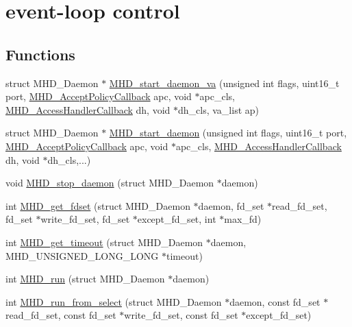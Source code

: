 \hypertarget{group__event}{\section{event-\/loop control}
\label{group__event}
}
\subsection*{\-Functions}
\begin{DoxyCompactItemize}
\item 
struct \-M\-H\-D\-\_\-\-Daemon $\ast$ \hyperlink{group__event_gae52e025a2bed7eacd487fe31dadb6c57}{\-M\-H\-D\-\_\-start\-\_\-daemon\-\_\-va} (unsigned int flags, uint16\-\_\-t port, \hyperlink{microhttpd_8h_aeb5663e00846f6a4df836e730381a9f2}{\-M\-H\-D\-\_\-\-Accept\-Policy\-Callback} apc, void $\ast$apc\-\_\-cls, \hyperlink{microhttpd_8h_a7d207efa3873993c6d3a72beb9367f75}{\-M\-H\-D\-\_\-\-Access\-Handler\-Callback} dh, void $\ast$dh\-\_\-cls, va\-\_\-list ap)
\item 
struct \-M\-H\-D\-\_\-\-Daemon $\ast$ \hyperlink{group__event_ga2630f8fc0c01fefe0abe1d2476b0388d}{\-M\-H\-D\-\_\-start\-\_\-daemon} (unsigned int flags, uint16\-\_\-t port, \hyperlink{microhttpd_8h_aeb5663e00846f6a4df836e730381a9f2}{\-M\-H\-D\-\_\-\-Accept\-Policy\-Callback} apc, void $\ast$apc\-\_\-cls, \hyperlink{microhttpd_8h_a7d207efa3873993c6d3a72beb9367f75}{\-M\-H\-D\-\_\-\-Access\-Handler\-Callback} dh, void $\ast$dh\-\_\-cls,...)
\item 
void \hyperlink{group__event_ga30c557319e35be05fceb99ce568e1242}{\-M\-H\-D\-\_\-stop\-\_\-daemon} (struct \-M\-H\-D\-\_\-\-Daemon $\ast$daemon)
\item 
int \hyperlink{group__event_gad3adac36bc7520280fe2b82fcc254801}{\-M\-H\-D\-\_\-get\-\_\-fdset} (struct \-M\-H\-D\-\_\-\-Daemon $\ast$daemon, fd\-\_\-set $\ast$read\-\_\-fd\-\_\-set, fd\-\_\-set $\ast$write\-\_\-fd\-\_\-set, fd\-\_\-set $\ast$except\-\_\-fd\-\_\-set, int $\ast$max\-\_\-fd)
\item 
int \hyperlink{group__event_gacda7636c2538a14f817befe91d7a2f21}{\-M\-H\-D\-\_\-get\-\_\-timeout} (struct \-M\-H\-D\-\_\-\-Daemon $\ast$daemon, \-M\-H\-D\-\_\-\-U\-N\-S\-I\-G\-N\-E\-D\-\_\-\-L\-O\-N\-G\-\_\-\-L\-O\-N\-G $\ast$timeout)
\item 
int \hyperlink{group__event_ga2cf4c3d03048b8ad410868998fc303ff}{\-M\-H\-D\-\_\-run} (struct \-M\-H\-D\-\_\-\-Daemon $\ast$daemon)
\item 
int \hyperlink{group__event_gab28b356fc218622c8e7e5aefb8ac5d52}{\-M\-H\-D\-\_\-run\-\_\-from\-\_\-select} (struct \-M\-H\-D\-\_\-\-Daemon $\ast$daemon, const fd\-\_\-set $\ast$read\-\_\-fd\-\_\-set, const fd\-\_\-set $\ast$write\-\_\-fd\-\_\-set, const fd\-\_\-set $\ast$except\-\_\-fd\-\_\-set)
\end{DoxyCompactItemize}


